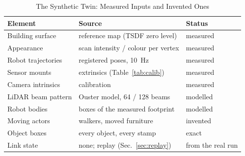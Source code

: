 \begin{table}[!t]
\centering
\caption{The Synthetic Twin: Measured Inputs and Invented Ones}
\label{tab:twin}
\begin{tabular}{lll}
\toprule
Element & Source & Status \\
\midrule
Building surface & reference map (TSDF zero level) & measured \\
Appearance & scan intensity / colour per vertex & measured \\
Robot trajectories & registered poses, \SI{10}{\hertz} & measured \\
Sensor mounts & extrinsics (Table~\ref{tab:calib}) & measured \\
Camera intrinsics & calibration & measured \\
LiDAR beam pattern & Ouster model, 64 / 128 beams & modelled \\
Robot bodies & boxes of the measured footprint & modelled \\
Moving actors & walkers, moved furniture & invented \\
Object boxes & every object, every stamp & exact \\
Link state & none; replay (Sec.~\ref{sec:replay}) & from the real run \\
\bottomrule
\end{tabular}
\end{table}
